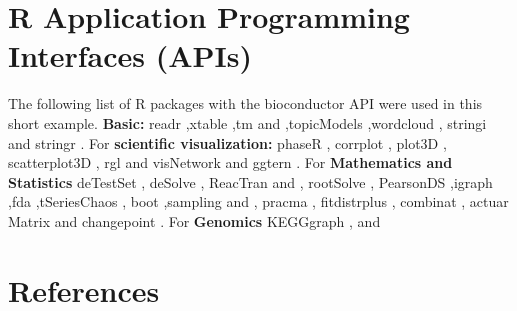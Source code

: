 \section{R Application Programming Interfaces (APIs)}

The following list of R packages\cite{key1000} with the bioconductor API were used in this short example. \textbf{ Basic:} readr \cite{key1001},xtable \cite{key1002},tm \cite{key1003} and \cite{key1004},topicModels \cite{key1005},wordcloud \cite{key1006}, stringi \cite{key1007} and stringr \cite{key1008}.  For \textbf{scientific visualization:} phaseR \cite{key2001}, corrplot \cite{key2002}, plot3D \cite{key2003}, scatterplot3D \cite{key2004}, rgl \cite{key2005} and visNetwork \cite{key2006} and ggtern \cite{key2007}. For \textbf{Mathematics and Statistics} deTestSet \cite{key3001}, deSolve \cite{key3002}, ReacTran \cite{key3003} and \cite{key3004}, rootSolve \cite{key3005}, PearsonDS \cite{key3006},igraph \cite{key3007},fda \cite{key3008},tSeriesChaos \cite{key3009}, boot \cite{key3010},sampling \cite{key3011} and \cite{key3012}, pracma \cite{key3013}, fitdistrplus \cite{key3014}, combinat \cite{key3015}, actuar \cite{key3016} Matrix \cite{key3017} and changepoint \cite{key3018}.  For \textbf{Genomics} KEGGgraph \cite{key4001}, \cite{key4002} and \cite{key4003}

\section{References}

